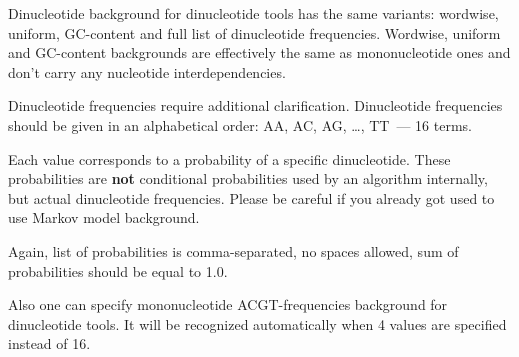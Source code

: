 Dinucleotide background for dinucleotide tools has the same variants: wordwise, uniform, GC-content and full list of dinucleotide frequencies. Wordwise, uniform and GC-content backgrounds are effectively the same as mononucleotide ones and don't carry any nucleotide interdependencies.

Dinucleotide frequencies require additional clarification. Dinucleotide frequencies should be given in an alphabetical order: AA, AC, AG, \dots, TT~--- 16 terms.

Each value corresponds to a probability of a specific dinucleotide. These probabilities are \textbf{not} conditional probabilities used by an algorithm internally, but actual dinucleotide frequencies.
Please be careful if you already got used to use Markov model background.

Again, list of probabilities is comma-separated, no spaces allowed, sum of probabilities should be equal to 1.0.

Also one can specify mononucleotide ACGT-frequencies background for dinucleotide tools. It will be recognized automatically when 4 values are specified instead of 16.
